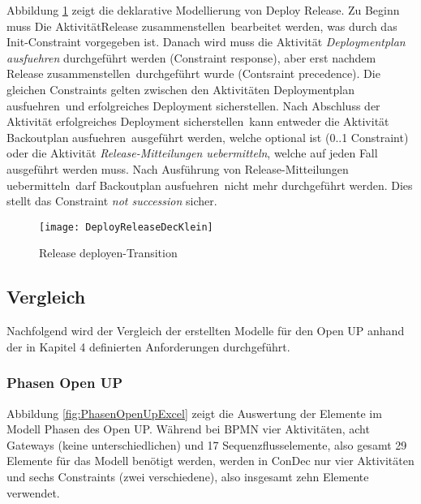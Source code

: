 Abbildung \ref{fig:DeployReleaseDecKlein} zeigt die deklarative Modellierung von Deploy Release.\newline
Zu Beginn muss Die Aktivität\grqq Release zusammenstellen\grqq \ bearbeitet werden, was durch das Init-Constraint vorgegeben ist. Danach wird muss die Aktivität \textit{Deploymentplan ausfuehren} durchgeführt werden (Constraint response), aber erst nachdem \grqq Release zusammenstellen\grqq \ durchgeführt wurde (Contsraint precedence).\newline
Die gleichen Constraints gelten zwischen den Aktivitäten \grqq Deploymentplan ausfuehren\grqq \ und \grqq erfolgreiches Deployment sicherstellen\grqq.\newline
Nach Abschluss der Aktivität \grqq erfolgreiches Deployment sicherstellen\grqq \ kann entweder die Aktivität \grqq Backoutplan ausfuehren\grqq \ ausgeführt werden, welche optional ist (0..1 Constraint) oder die Aktivität \textit{Release-Mitteilungen uebermitteln}, welche auf jeden Fall ausgeführt werden muss.\newline 
Nach Ausführung von \grqq Release-Mitteilungen uebermitteln\grqq \ darf \grqq Backoutplan ausfuehren\grqq \ nicht mehr durchgeführt werden. Dies stellt das Constraint \textit{not succession} sicher.
\begin{figure}[htp]
\begin{center}
  \texttt{[image: DeployReleaseDecKlein]} %
  \caption{Release deployen-Transition}
  \label{fig:DeployReleaseDecKlein}
\end{center}
\end{figure}

\clearpage

\subsection{Vergleich}

Nachfolgend wird der Vergleich der erstellten Modelle für den Open UP anhand der in Kapitel 4 definierten Anforderungen durchgeführt.

\subsubsection {Phasen Open UP}


Abbildung \ref{fig:PhasenOpenUpExcel} zeigt die Auswertung der Elemente im Modell \grqq Phasen des Open UP\grqq. Während bei BPMN vier Aktivitäten, acht Gateways (keine unterschiedlichen) und 17 Sequenzflusselemente, also gesamt 29 Elemente für das Modell benötigt werden, werden in ConDec nur vier Aktivitäten und sechs Constraints (zwei verschiedene), also insgesamt zehn Elemente verwendet.

